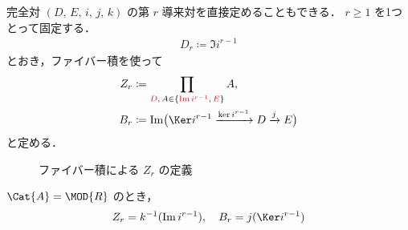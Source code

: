 \documentclass[algtopo_main]{subfiles}
\begin{document}
完全対 $(D,\, E,\, i,\, j,\, k)$ の第 $r$ 導来対を直接定めることもできる．
$r \ge 1$ を1つとって固定する．
\begin{align}
    D_r \coloneqq \Im i^{r-1}
\end{align}
とおき，ファイバー積を使って
\begin{align}
    Z_r &\coloneqq \prod_{\textcolor{red}{D},\, A \in \{\textcolor{red}{\Im i^{r-1}},\, \textcolor{red}{E}\}} A, \\
    B_r &\coloneqq \Im \bigl( \Ker i^{r-1} \xrightarrow{\ker i^{r-1}} D \xrightarrow{j} E\bigr) 
\end{align}
と定める．
\begin{figure}[H]
    \centering
    \caption{ファイバー積による $Z_r$ の定義}
    \label{cmtd:DC-fiber}
\end{figure}%

\begin{mylem}[label=lem:DC-rth-RMod]{}
    $\Cat{A} = \MOD{R}$ のとき，
    \begin{align}
        Z_r = k^{-1}(\Im i^{r-1}),\quad B_r = j (\Ker i^{r-1})
    \end{align}
\end{mylem}
\end{document}
